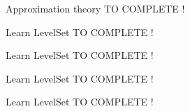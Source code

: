 \begin{frame}{Approximation theory}
	TO COMPLETE !
\end{frame}

\begin{frame}{Learn LevelSet }
	TO COMPLETE !
\end{frame}

\begin{frame}{Learn LevelSet }
	TO COMPLETE !
\end{frame}

\begin{frame}{Learn LevelSet }
	TO COMPLETE !
\end{frame}

\begin{frame}{Learn LevelSet }
	TO COMPLETE !
\end{frame}